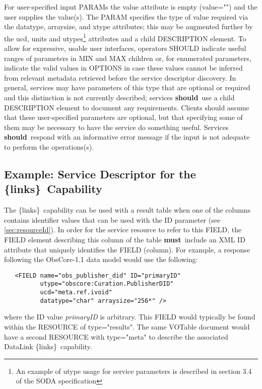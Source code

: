 \documentclass[11pt,a4paper]{ivoa}
\newcommand{\blinks}{\{links\}}
\newcommand{\attval}[2]{#1={\allowbreak}{"}#2{"}}
\newcommand{\rfcmust}{\textbf{must}}
\newcommand{\rfcshould}{\textbf{should}}
\begin{document}
For user-specified input PARAMs the value attribute is empty (\attval{value}{})
and the user supplies the value(s). The PARAM specifies the type of value required via
the datatype, arraysize, and xtype attributes; this may be augmented further by the ucd,
 units and utypes\footnote{An example of utype usage for service
parameters is described in section 3.4 of the SODA specification} attributes
and a child DESCRIPTION element. To allow for expressive, usable user
interfaces, operators SHOULD indicate useful ranges of parameters in MIN and MAX children
or, for enumerated parameters, indicate the valid values in OPTIONS  in case
these values cannot be inferred from relevant metadata retrieved
before the service descriptor discovery. In general, services
may have parameters of this type that are optional or required and this distinction is
not currently described; services \rfcshould\ use a child DESCRIPTION element to document any
requirements. Clients should assume that these user-specified parameters are optional, but
that specifying some of them may be necessary to have the service do something useful.
Services \rfcshould\ respond with an informative error message if the input is not adequate to
perform the operations(s).

\subsection{Example: Service Descriptor for the \blinks\ Capability}

The \blinks\ capability can be used with a result table when one of the
columns contains identifier values that can be used with the ID parameter
(see \ref{sec:resourceId}).
In order for the service resource to refer to this FIELD,
the FIELD element describing this column of the table
\rfcmust\ include an XML ID attribute
that uniquely identifies the FIELD (column).
For example, a response following the ObsCore-1.1 data model
would use the following:
\begin{verbatim}
   <FIELD name="obs_publisher_did" ID="primaryID"
          utype="obscore:Curation.PublisherDID"
          ucd="meta.ref.ivoid"
          datatype="char" arraysize="256*" />
\end{verbatim}
where the ID value {\em primaryID\/} is arbitrary.
This FIELD would typically
be found within the RESOURCE of \attval{type}{results}. The same VOTable
document would have a second RESOURCE with \attval{type}{meta} to describe
the associated DataLink \blinks\ capability.
\end{document}

